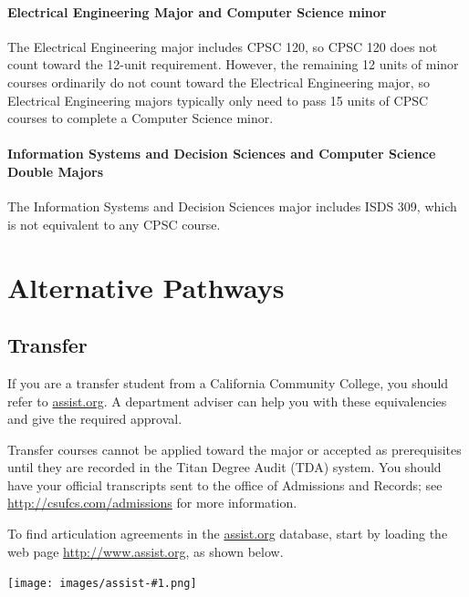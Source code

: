 \documentclass{book}
\newcommand{\shrunkurl}[1]{\url{http://csufcs.com/#1}}
\begin{document}
\subsubsection{Electrical Engineering Major and Computer Science minor}

The Electrical Engineering major includes CPSC 120, so CPSC 120 does
not count toward the 12-unit requirement. However, the remaining 12
units of minor courses ordinarily do not count toward the Electrical
Engineering major, so Electrical Engineering majors typically only
need to pass 15 units of CPSC courses to complete a Computer Science
minor.

\subsubsection{Information Systems and Decision Sciences and Computer Science Double Majors}

The Information Systems and Decision Sciences major includes ISDS 309,
which is not equivalent to any CPSC course.
 
\chapter{Alternative Pathways}

\section{Transfer}

If you are a transfer student from a California Community College, you
should refer to \url{assist.org}. A department adviser can help you
with these equivalencies and give the required approval.

Transfer courses cannot be applied toward the major or accepted as
prerequisites until they are recorded in the Titan Degree Audit (TDA)
system. You should have your official transcripts sent to the office
of Admissions and Records; see \shrunkurl{admissions} for more
information.

To find articulation agreements in the \url{assist.org} database,
start by loading the web page \url{http://www.assist.org}, as shown
below.

\newcommand{\AssistOrgScreenshot}[1]{
  \begin{center}
    \texttt{[image: images/assist-\#1.png]}
  \end{center}
}

\AssistOrgScreenshot{1}
\end{document}
